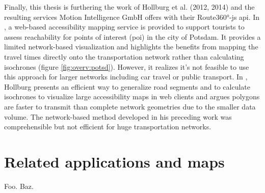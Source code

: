     Finally, this thesis is furthering the work of Hollburg et al. (2012,
    2014) and the resulting services Motion Intelligence GmbH offers with their
    Route360°-\acrshort{js} \acrshort{api}. In \cite{hollburghier}, a web-based
    accessibility mapping service is provided to support tourists to assess
    reachability for points of interest (\acrshort{poi}) in the city of Potsdam.
    It provides a
    limited network-based visualization and highlights the benefits from
    mapping the travel times directly onto the transportation network rather
    than calculating isochrones (figure \ref{fig:overv:potsd}). However, it
    realizes it's not feasible to use this approach for larger networks
    including car travel or public transport. In \cite{Hollburg2014}, Hollburg
    presents an efficient way to generalize road segments and to calculate
    isochrones to visualize large accessibility maps in web clients and argues
    polygons are faster to transmit than complete network geometries due to the
    smaller data volume. The network-based method developed in his preceding
    work was comprehensible but not efficient for huge transportation networks.

  \section{Related applications and maps}
    \label{sec:overv:applc}



    Foo. Baz.


%
%
%
%
%
%
%
%
%
%



